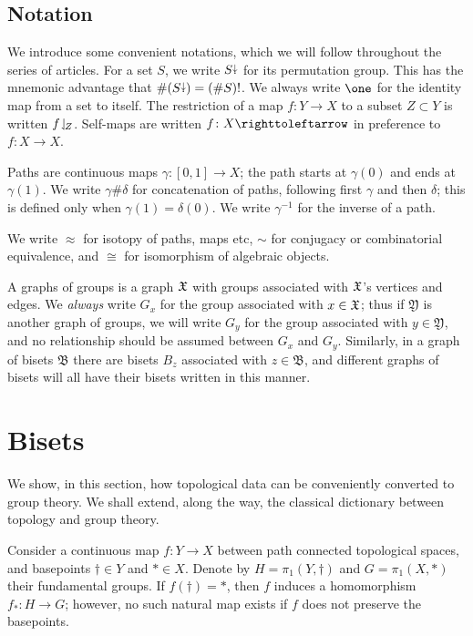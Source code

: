 \documentclass{amsart}
\begin{document}
\subsection{Notation}
We introduce some convenient notations, which we will follow
throughout the series of articles. For a set $S$, we write $S{\stackrel{\downarrow}{\smash.}}$
for its permutation group. This has the mnemonic advantage that
$\#(S{\stackrel{\downarrow}{\smash.}})=(\#S)!$. We always write $\one$ for the identity map from
a set to itself. The restriction of a map $f\colon Y\to X$ to a subset
$Z\subset Y$ is written $f\!\downharpoonleft_{\!Z}$.  Self-maps are written
$f\colon X\selfmap$ in preference to $f\colon X \to X$.

Paths are continuous maps $\gamma\colon[0,1]\to X$; the path starts at
$\gamma(0)$ and ends at $\gamma(1)$. We write $\gamma\#\delta$ for
concatenation of paths, following first $\gamma$ and then $\delta$;
this is defined only when $\gamma(1)=\delta(0)$. We write
$\gamma^{-1}$ for the inverse of a path.

We write $\approx$ for isotopy of paths, maps etc, $\sim$ for
conjugacy or combinatorial equivalence, and $\cong$ for isomorphism of
algebraic objects.

A graphs of groups is a graph ${\mathfrak X}$ with groups associated with ${\mathfrak X}$'s
vertices and edges. We \emph{always} write $G_x$ for the group associated
with $x\in{\mathfrak X}$; thus if $\mathfrak Y$ is another graph of groups, we will
write $G_y$ for the group associated with $y\in\mathfrak Y$, and no
relationship should be assumed between $G_x$ and $G_y$. Similarly, in a
graph of bisets $\mathfrak B$ there are bisets $B_z$ associated with
$z\in\mathfrak B$, and different graphs of bisets will all have their bisets
written in this manner.

\section{Bisets}
We show, in this section, how topological data can be conveniently
converted to group theory. We shall extend, along the way, the
classical dictionary between topology and group theory.

Consider a continuous map $f\colon Y\to X$ between path connected topological
spaces, and basepoints $\dagger\in Y$ and $*\in X$. Denote by
$H=\pi_1(Y,\dagger)$ and $G=\pi_1(X,*)$ their fundamental groups. If
$f(\dagger)=*$, then $f$ induces a homomorphism $f_*\colon H\to G$; however, no
such natural map exists if $f$ does not preserve the basepoints.
\end{document}
